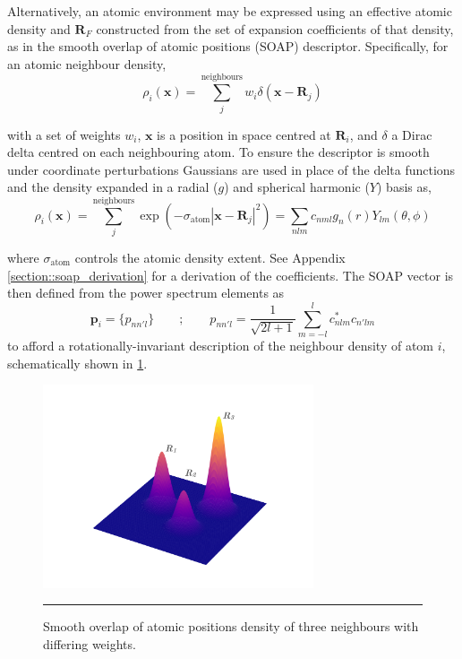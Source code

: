 \documentclass[main.tex]{subfiles}
\begin{document}


Alternatively, an atomic environment may be expressed using an effective atomic density and $\boldsymbol{R}_F$ constructed from the set of expansion coefficients of that density, as in the smooth overlap of atomic positions (SOAP) descriptor.\cite{Bartok2013} Specifically, for an atomic neighbour density,
\begin{equation}
	\rho_i(\boldsymbol{x}) = \sum_j^\text{neighbours} w_i \delta(\boldsymbol{x} - \boldsymbol{R}_j)
\end{equation}

with a set of weights $w_i$, $\boldsymbol{x}$ is a position in space centred at $\boldsymbol{R}_i$, and $\delta$ a Dirac delta centred on each neighbouring atom. To ensure the descriptor is smooth under coordinate perturbations Gaussians are used in place of the delta functions and the density expanded in a radial ($g$) and spherical harmonic ($Y$) basis as,
\begin{equation}
	\rho_i(\boldsymbol{x}) = \sum_j^\text{neighbours}  \exp(-\sigma_\text{atom} |\boldsymbol{x} - \boldsymbol{R}_j|^2)  = \sum_{nlm} c_{nml} g_n(r) Y_{lm}(\theta, \phi)
\end{equation}

where $\sigma_\text{atom}$ controls the atomic density extent. See Appendix \ref{section::soap_derivation} for a derivation of the coefficients. The SOAP vector is then defined from the power spectrum elements as
\begin{equation}
	\boldsymbol{p}_i = \{p_{n n' l}\} \qquad ; \qquad p_{n n' l} = \frac{1}{\sqrt{2l + 1}} \sum_{m=-l}^l c_{nlm}^* c_{n'lm}
\end{equation}
to afford a rotationally-invariant description of the neighbour density of atom $i$, schematically shown in \figurename{ \ref{fig::theory_soap}}.

\begin{figure}[h!]
	\centering
	\includegraphics[width=8cm]{2/figs/fig3/SOAP.pdf}
	\vspace{0.5cm}
	\hrule
	\caption{Smooth overlap of atomic positions density of three neighbours with differing weights.}
	\label{fig::theory_soap}
\end{figure}
\end{document}
